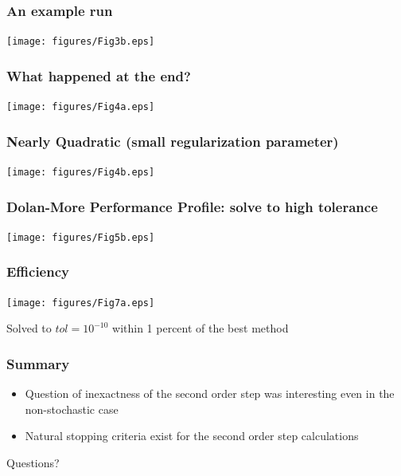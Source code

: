\documentclass{beamer}
\begin{document}
							 
							 

							 \begin{frame}
							 	\frametitle{An example run}
								\begin{center}
							 				\texttt{[image: figures/Fig3b.eps]}
											\end{center}
							 \end{frame}
							 \begin{frame}
							 	\frametitle{What happened at the end?}
								\begin{center}
							 				\texttt{[image: figures/Fig4a.eps]}
											\end{center}
							 \end{frame}
							 
							 \begin{frame}
							 	\frametitle{Nearly Quadratic (small regularization parameter)}
								\begin{center}
							 				\texttt{[image: figures/Fig4b.eps]}
											\end{center}
							 \end{frame}
							 
							 \begin{frame}
							 	\frametitle{Dolan-More Performance Profile: solve to high tolerance}
								\begin{center}
							 				\texttt{[image: figures/Fig5b.eps]}
											\end{center}
							 \end{frame}
							 \begin{frame}
							 	\frametitle{Efficiency}
								\begin{center}
							 				\texttt{[image: figures/Fig7a.eps]}
											
											Solved to $tol = 10^{-10}$ within 1 percent of the best method
											\end{center}
							 \end{frame}
							 
							
							 \begin{frame}
							 	\frametitle{Summary}
								\begin{itemize}
									\item Question of inexactness of the second order step was interesting even in the non-stochastic case
									\item Natural stopping criteria exist for the second order step calculations 
								\end{itemize}
							 \end{frame}
							 

							 \begin{frame}
							 				Questions?
							 \end{frame}
							 
							 
							 
							 
							 
\end{document}
